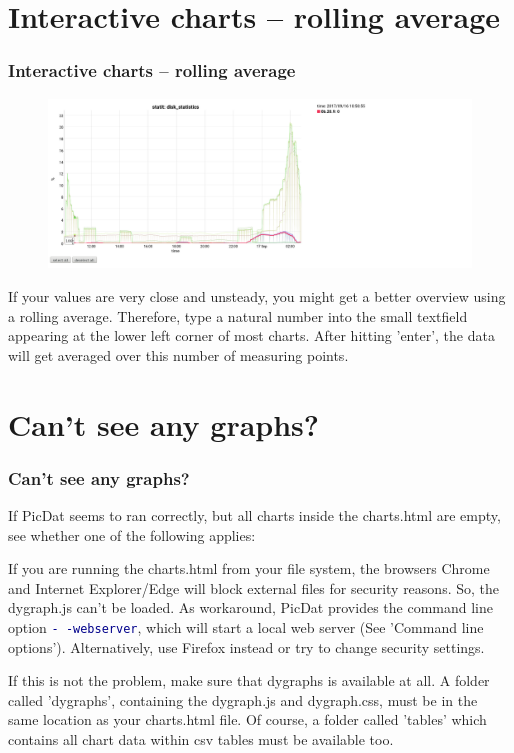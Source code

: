 \documentclass[8pt]{beamer}
\begin{document}
\section{Interactive charts -- rolling average}
\begin{frame}
\frametitle{Interactive charts -- rolling average} 
\begin{figure}
	\includegraphics[width=\textwidth]{../images/PicDat_roller.png}
\end{figure}

If your values are very close and unsteady, you might get a better overview using a rolling average. Therefore, type a natural number into the small textfield appearing at the lower left corner of most charts. After hitting 'enter', the data will get averaged over this number of measuring points.
\end{frame}

\section{Can't see any graphs?}
\begin{frame}
\frametitle{Can't see any graphs?}
If PicDat seems to ran correctly, but all charts inside the charts.html are empty, see whether one of the following applies:
\bigskip

If you are running the charts.html from your file system, the browsers Chrome and Internet Explorer/Edge will block external files for security reasons. So, the dygraph.js can't be loaded. As workaround, PicDat provides the command line option \textcolor{darkblue}{\texttt{-\,-webserver}}, which will start a local web server (See 'Command line options'). Alternatively, use Firefox instead or try to change security settings.
\bigskip

If this is not the problem, make sure that dygraphs is available at all. A folder called 'dygraphs', containing the dygraph.js and dygraph.css, must be in the same location as your charts.html file. Of course, a folder called 'tables' which contains all chart data within csv tables must be available too.
\end{frame}
\end{document}
